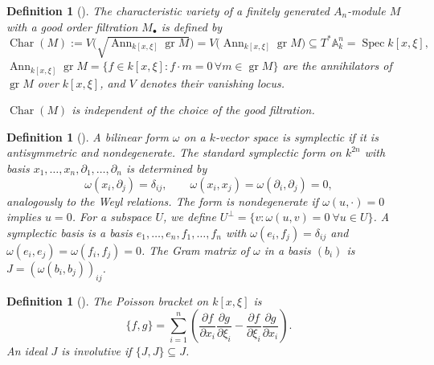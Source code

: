 \documentclass[pdflatex,sn-mathphys-num]{sn-jnl}
\numberwithin{equation}{section}
\theoremstyle{thmstyleone}
\newtheorem{definition}[theorem]{Definition}
\theoremstyle{thmstyletwo}
\newcommand{\Char}{\operatorname{Char}}
\newcommand{\gr}{\operatorname{gr}}
\newcommand{\Ann}{\operatorname{Ann}}
\newcommand{\Spec}{\operatorname{Spec}}
\begin{document}
\begin{definition}[{\cite[Ch. 2.2]{HTT}}]\label{def:char-variety}
    The \emph{characteristic variety} of a finitely generated $A_n$-module $M$ with a good order filtration
$M_\bullet$ is defined by
\[\Char(M):=V\bigl(\sqrt{\Ann_{k[x,\xi]}\gr M}\bigr) = V\bigl(\Ann_{k[x,\xi]}\gr M\bigr)\subseteq
  T^*\mathbb A^n_k=\Spec k[x,\xi],\]
$\Ann_{k[x,\xi]}\gr M = \{f \in k[x,\xi]: f\cdot m = 0\,\forall m \in \gr M\}$ are the \emph{annihilators} of $\gr M$ over $k[x,\xi]$, and $V$ denotes their vanishing locus.

$\Char(M)$ is independent of the choice of the good filtration. \cite[Lemma D.3.1]{HTT}
\end{definition}


\begin{definition}[{\cite[Ch. E.1]{HTT}}]\label{def:symplectic}
A bilinear form $\omega$ on a $k$-vector space is \emph{symplectic} if it is
antisymmetric and nondegenerate. The \emph{standard symplectic form} on $k^{2n}$
with basis $x_1,\dots,x_n,\partial_1,\dots,\partial_n$ is determined by
\[ \omega(x_i,\partial_j)=\delta_{ij},\qquad
 \omega(x_i,x_j)=\omega(\partial_i,\partial_j)=0,\]
analogously to the Weyl relations. 
The form is \emph{nondegenerate} if $\omega(u,\cdot)=0$ implies $u=0$. For a subspace $U$, we define 
$U^\perp=\{v:\omega(u,v)=0\ \forall u\in U\}$. A \emph{symplectic basis} is a basis
$e_1,\dots,e_n,f_1,\dots,f_n$ with $\omega(e_i,f_j)=\delta_{ij}$ and
$\omega(e_i,e_j)=\omega(f_i,f_j)=0$. The \emph{Gram matrix} of $\omega$ in a basis
$(b_i)$ is $J=(\omega(b_i,b_j))_{ij}$.
\end{definition}

\begin{definition}[{\cite[Appendix D.3]{HTT}}]\label{def:poisson}
The \emph{Poisson bracket} on $k[x,\xi]$ is
\[ \{f,g\}=\sum_{i=1}^n\left(
   \frac{\partial f}{\partial x_i}\frac{\partial g}{\partial \xi_i}
   -\frac{\partial f}{\partial \xi_i}\frac{\partial g}{\partial x_i}\right).\]
An ideal $J$ is \emph{involutive} if $\{J,J\}\subseteq J$. 

\end{definition}
\end{document}
